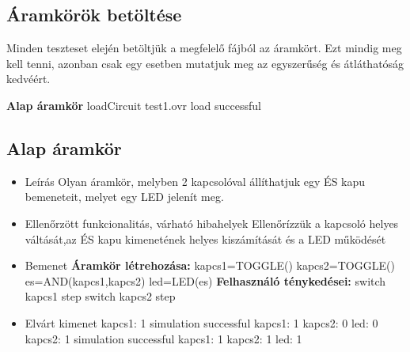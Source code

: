 \subsection{Áramkörök betöltése}
Minden teszteset elején betöltjük a megfelelő fájból az áramkört. Ezt mindig meg kell tenni, azonban csak egy esetben mutatjuk meg az egyszerűség és átláthatóság kedvéért.

\textbf{Alap áramkör}\newline
loadCircuit test1.ovr\newline
\newline
load successful


\subsection{Alap áramkör}
\begin{itemize}
\item Leírás\newline
Olyan áramkör, melyben 2 kapcsolóval állíthatjuk egy ÉS kapu bemeneteit, melyet egy LED jelenít meg.
\item Ellenőrzött funkcionalitás, várható hibahelyek\newline
Ellenőrízzük a kapcsoló helyes váltását,az ÉS kapu kimenetének helyes kiszámítását és a LED működését
\item Bemenet\newline
\newline
{\bf Áramkör létrehozása:}\newline
kapcs1=TOGGLE()\newline
kapcs2=TOGGLE()\newline
es=AND(kapcs1,kapcs2)\newline
led=LED(es)\newline
{\bf Felhasználó ténykedései:}\newline
switch kapcs1
step
switch kapcs2
step
\item Elvárt kimenet\newline
kapcs1: 1\newline
simulation successful\newline
kapcs1: 1\newline
kapcs2: 0\newline
led: 0\newline
kapcs2: 1\newline
simulation successful\newline
kapcs1: 1\newline
kapcs2: 1\newline
led: 1\newline
\end{itemize}

